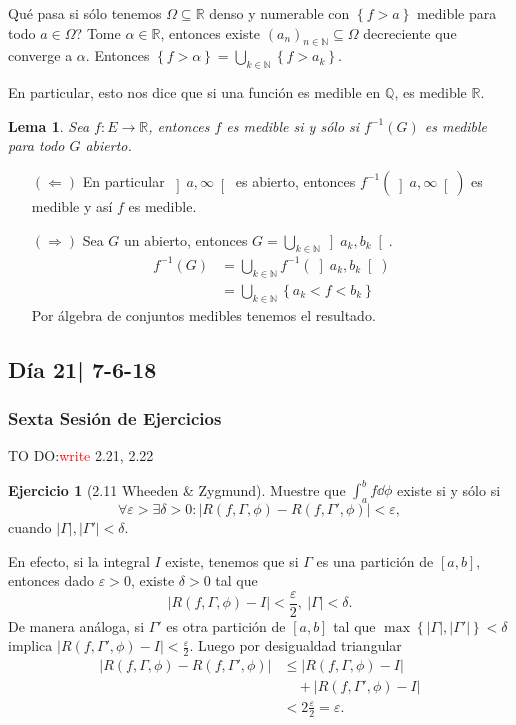 \documentclass[12pt]{article}
\theoremstyle{plain}
\newtheorem{Lem}[Th]{Lema}             %
\theoremstyle{definition}
\newtheorem{Ej}[Th]{Ejercicio}
\theoremstyle{remark}
\numberwithin{equation}{section}
\newcommand{\Om}{\varOmega}         %
\newcommand{\bN}{\mathbb{N}}        %
\newcommand{\bQ}{\mathbb{Q}}        %
\newcommand{\bR}{\mathbb{R}}        %
\renewcommand{\leq}{\leqslant}      %
\renewcommand{\:}{\colon}           %
\newcommand{\conj}[1]{\left\lbrace#1\right\rbrace}
\newcommand{\bonj}[1]{\left\lbrack#1\right\rbrack}
\newcommand{\obonj}[1]{\left\rbrack#1\right\lbrack}
\begin{document}
\begin{multicols}{2}
Qué pasa si sólo tenemos $\Om\subseteq\bR$ denso y numerable con $\conj{f>a}$ medible para todo $a\in\Om$? Tome $\alpha\in\bR$, entonces existe $(a_n)_{n\in\bN}\subseteq\Om$ decreciente que converge a $\alpha$. Entonces $\conj{f>\alpha}=\bigcup_{k\in\bN}\conj{f>a_k}$.\par
En particular, esto nos dice que si una función es medible en $\bQ$, es medible $\bR$.

\begin{Lem}
  Sea $f\: E\to\bR$, entonces $f$ es medible si y sólo si $f^{-1}(G)$ es medible para todo $G$ abierto.
\end{Lem}

\begin{ptcbp}
\begin{enumerate}
  \item[$(\Leftarrow)$] En particular $\obonj{a,\infty}$ es abierto, entonces $f^{-1}(\obonj{a,\infty})$ es medible y así $f$ es medible.
  \item[$(\Rightarrow)$] Sea $G$ un abierto, entonces $G=\bigcup_{k\in\bN}\obonj{a_k,b_k}$.
  \begin{align*}
    f^{-1}(G) &=\bigcup_{k\in\bN}f^{-1}(\obonj{a_k,b_k})\\
     &=\bigcup_{k\in\bN}\conj{a_k<f<b_k}
  \end{align*}
  Por álgebra de conjuntos medibles tenemos el resultado.
\end{enumerate}
\end{ptcbp}

\subsection{Día 21| 7-6-18}

\subsubsection*{Sexta Sesión de Ejercicios}
TO DO:\textcolor{red}{write } 2.21, 2.22

\begin{Ej}[2.11  Wheeden \& Zygmund]
  Muestre que $\int_{a}^{b}f\dd\phi$ existe si y sólo si
  $$\forall\varepsilon>\exists\delta>0\: |R(f,\Gamma,\phi)-R(f,\Gamma',\phi)|<\varepsilon,$$
  cuando $|\Gamma|,|\Gamma'|<\delta$.
\end{Ej}

\begin{ptcbp}
En efecto, si la integral $I$ existe, tenemos que si $\Gamma$ es una partición de $\bonj{a,b}$, entonces dado $\varepsilon>0$, existe $\delta>0$ tal que
$$|R(f,\Gamma,\phi)-I|<\frac{\varepsilon}{2},\ |\Gamma|<\delta.$$
De manera análoga, si $\Gamma'$ es otra partición de $\bonj{a,b}$ tal que $\max\conj{|\Gamma|,|\Gamma'|}<\delta$ implica $|R(f,\Gamma',\phi)-I|<\frac{\varepsilon}{2}$. Luego por desigualdad triangular
\begin{align*}
  |R(f,\Gamma,\phi)-R(f,\Gamma',\phi)| &\leq |R(f,\Gamma,\phi)-I|\\
  &\quad+|R(f,\Gamma',\phi)-I|\\
  &<2\frac{\varepsilon}{2}=\varepsilon.
\end{align*}


\end{ptcbp}
\end{multicols}
\end{document}
